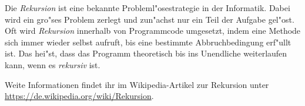 Die \emph{Rekursion} ist eine bekannte Probleml"osestrategie in der Informatik. Dabei wird ein gro"ses Problem zerlegt und zun"achst nur ein Teil der Aufgabe gel"ost. Oft wird \emph{Rekursion} innerhalb von Programmcode umgesetzt, indem eine Methode sich immer wieder selbst aufruft, bis eine bestimmte Abbruchbedingung erf"ullt ist. Das hei"st, dass das Programm theoretisch bis ins Unendliche weiterlaufen kann, wenn es \emph{rekursiv} ist. 

Weite Informationen findet ihr im Wikipedia-Artikel zur Rekursion unter \url{https://de.wikipedia.org/wiki/Rekursion}.